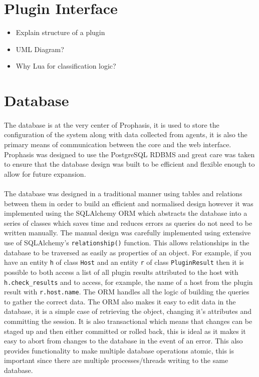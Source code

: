 \documentclass[bsc,logo,twoside,singlespacing]{infthesis}
\begin{document}
\section{Plugin Interface}
\begin{itemize}
	\item Explain structure of a plugin
	\item UML Diagram?
	\item Why Lua for classification logic?
\end{itemize}

\section{Database}
\paragraph*{}
	The database is at the very center of Prophasis, it is used to store the
	configuration of the system along with data collected from agents, it is also
	the primary means of communication between the core and the web interface.
	Prophasis was designed to use the PostgreSQL RDBMS and great care was taken to
	ensure that the database design was built to be efficient and flexible enough
	to allow for future expansion.
	
\paragraph*{}
	The database was designed in a traditional manner using tables and relations
	between them in order to build an efficient and normalised design however it
	was implemented using the SQLAlchemy ORM which abstracts the database into a
	series of classes which saves time and reduces errors as queries do not need
	to be written manually.  The manual design was carefully implemented using
	extensive use of SQLAlchemy's \texttt{relationship()} function.  This allows
	relationships in the database to be traversed as easily as properties of an
	object.  For example, if you have an entity \texttt{h} of class \texttt{Host}
	and an entity \texttt{r} of class \texttt{PluginResult} then it is possible
	to both access a list of all plugin results attributed to the host with
	\texttt{h.check\_results} and to access, for example, the name of a host
	from the plugin result with \texttt{r.host.name}.  The ORM handles all the
	logic of building the queries to gather the correct data.  The ORM also makes
	it easy to edit data in the database, it is a simple case of retrieving the
	object, changing it's attributes and committing the session.  It is also
	transactional which means that changes can be staged up and then either
	committed or rolled back, this is ideal as it makes it easy to abort from
	changes to the database in the event of an error.  This also provides
	functionality to make multiple database operations atomic, this is important
	since there are multiple processes/threads writing to the same database.
	
\end{document}
